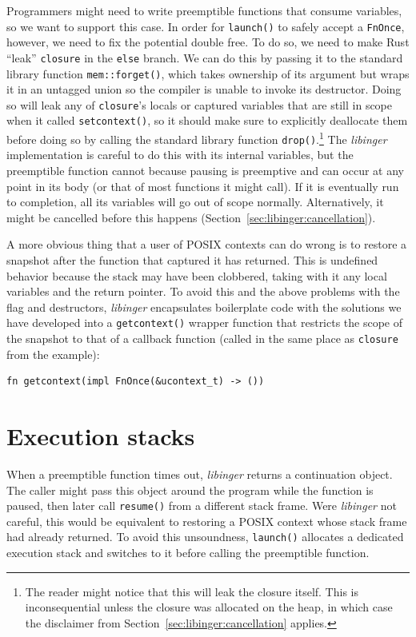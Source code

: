 Programmers might need to write preemptible functions that consume variables, so we
want to support this case.  In order for \texttt{launch()} to safely accept a
\texttt{FnOnce}, however, we need to fix the potential double free.  To do so, we
need to make Rust ``leak'' \texttt{closure} in the \texttt{else} branch.  We can do
this by passing it to the standard library function \texttt{mem::forget()}, which
takes ownership of its argument but wraps it in an untagged union so the compiler is
unable to invoke its destructor.  Doing so will leak any of \texttt{closure}'s locals
or captured variables that are still in scope when it called \texttt{setcontext()},
so it should make sure to explicitly deallocate them before doing so by calling the
standard library function \texttt{drop()}.\footnote{The reader might notice that this
will leak the closure itself.  This is inconsequential unless the closure was
allocated on the heap, in which case the disclaimer from
Section~\ref{sec:libinger:cancellation} applies.}  The \textit{libinger}
implementation is careful to do this with its internal variables, but the preemptible
function cannot because pausing is preemptive and can occur at any point in its body
(or that of most functions it might call).  If it is eventually run to completion,
all its variables will go out of scope normally.  Alternatively, it might be
cancelled before this happens (Section~\ref{sec:libinger:cancellation}).

A more obvious thing that a user of POSIX contexts can do wrong is to restore a
snapshot after the function that captured it has returned.  This is undefined
behavior because the stack may have been clobbered, taking with it any local
variables and the return pointer.  To avoid this and the above problems with the flag
and destructors, \textit{libinger} encapsulates boilerplate code with the solutions
we have developed into a \texttt{getcontext()} wrapper function that restricts the
scope of the snapshot to that of a callback function (called in the same place as
\texttt{closure} from the example):
\begin{lstlisting}[morekeywords={fn,impl,FnOnce}]
  fn getcontext(impl FnOnce(&ucontext_t) -> ())
\end{lstlisting}


\section{Execution stacks}
\label{sec:libinger:stacks}

When a preemptible function times out, \textit{libinger} returns a continuation
object.  The caller might pass this object around the program while the function is
paused, then later call \texttt{resume()} from a different stack frame.  Were
\textit{libinger} not careful, this would be equivalent to restoring a POSIX context
whose stack frame had already returned.  To avoid this unsoundness, \texttt{launch()}
allocates a dedicated execution stack and switches to it before calling the
preemptible function.

